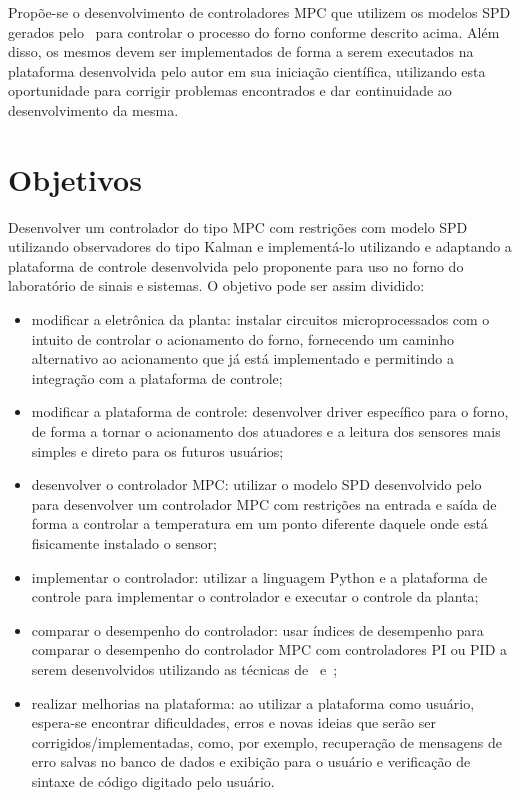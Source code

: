 Propõe-se o desenvolvimento de controladores \ac{MPC} que utilizem os modelos
\ac{SPD} gerados pelo~\textcite{masterthesis:nelson} para controlar o processo
do forno conforme descrito acima. Além disso, os mesmos devem ser implementados
de forma a serem executados na plataforma desenvolvida pelo autor em sua
iniciação científica, utilizando esta oportunidade para corrigir problemas
encontrados e dar continuidade ao desenvolvimento da mesma.

\section{Objetivos}%
\label{sec:objectives}

Desenvolver um controlador do tipo \ac{MPC} com restrições com modelo \ac{SPD}
utilizando observadores do tipo Kalman e implementá-lo utilizando e adaptando a
plataforma de controle desenvolvida pelo proponente para uso no forno do
laboratório de sinais e sistemas. O objetivo pode ser assim dividido:

\begin{itemize}
      \item modificar a eletrônica da planta: instalar circuitos
            microprocessados com o intuito de controlar o acionamento do forno,
            fornecendo um caminho alternativo ao acionamento que já está
            implementado e permitindo a integração com a plataforma de controle;
      \item modificar a plataforma de controle: desenvolver driver específico
            para o forno, de forma a tornar o acionamento dos atuadores e a
            leitura dos sensores mais simples e direto para os futuros usuários;
      \item desenvolver o controlador \ac{MPC}\@: utilizar o modelo \ac{SPD}
            desenvolvido pelo~\textcite{masterthesis:nelson} para desenvolver um
            controlador \ac{MPC} com restrições na entrada e saída de forma a
            controlar a temperatura em um ponto diferente daquele onde está
            fisicamente instalado o sensor;
      \item implementar o controlador: utilizar a linguagem Python e a
            plataforma de controle para implementar o controlador e executar o
            controle da planta;
      \item comparar o desempenho do controlador: usar índices de desempenho
            para comparar o desempenho do controlador \ac{MPC} com controladores
            PI ou PID a serem desenvolvidos utilizando as técnicas
            de~\textcite{article:clarke} e~\textcite{article:martins};
      \item realizar melhorias na plataforma: ao utilizar a plataforma como
            usuário, espera-se encontrar dificuldades, erros e novas ideias que
            serão ser corrigidos/implementadas, como, por exemplo, recuperação
            de mensagens de erro salvas no banco de dados e exibição para o
            usuário e verificação de sintaxe de código digitado pelo usuário.
\end{itemize}

